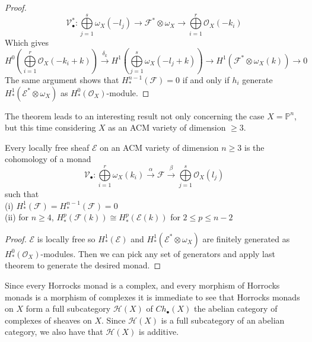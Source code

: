 \documentclass[
	oldfontcommands,
	sumario=abnt-6027-2012,
	12pt,			%
	openright,		%
	oneside,		%
	a4paper,		%
	english,		%
	brazil			%
	]{imecc-unicamp}
\begin{document}
\begin{proof}
\begin{equation}
\mathcal{V}_\bullet ^* :\bigoplus\limits_{j=1}^s \omega_X (-l_j) \to \mathcal{F}^* \otimes \omega_X \to \bigoplus\limits_{i=1}^r \mathcal{O}_X (-k_i)
\end{equation}
Which gives
\begin{equation}
H^0(\bigoplus\limits_{i=1}^r \mathcal{O}_X (-k_i+k)) \overset{\delta_k}{\to} H^1(\bigoplus\limits_{j=1}^s \omega_X (-l_j+k)) \to H^1(\mathcal{F}^* \otimes \omega_X(k)) \to 0
\end{equation}
The same argument shows that $H^{n-1}_* (\mathcal{F})=0$ if and only if $h_i$ generate $H^1 _* (\mathcal{E}^* \otimes \omega_X)$ as $H^0 _* (\mathcal{O}_X)$-module.
\end{proof}
The theorem leads to an interesting result not only concerning the case $X=\mathbb{P}^n$, but this time considering $X$ as an ACM variety of dimension $\geq 3$.
\begin{corollary}\cite[Jardim \& Martins]{jardim2}
Every locally free sheaf $\mathcal{E}$ on an ACM variety of dimension $n \geq 3$ is the cohomology of a monad
\begin{equation}
\mathcal{V}_\bullet : \bigoplus\limits_{i=1}^r \omega_X (k_i) \overset{ \alpha }{ \to} \mathcal{F} \overset{ \beta }{ \to} \bigoplus\limits_{j=1}^s \mathcal{O}_X (l_j)
\end{equation}
such that \\
(i) $H^1_*(\mathcal{F}) = H^{n-1}_*(\mathcal{F})=0$ \\
(ii) for $n \geq 4$, $H^p_* (\mathcal{F}(k)) \cong H^p_*(\mathcal{E}(k))$ for $2 \leq p \leq n-2$
\end{corollary}
\begin{proof}
$\mathcal{E}$ is locally free so $H^1_*(\mathcal{E})$ and $H^1_*(\mathcal{E}^* \otimes \omega_X)$ are finitely generated as $H^0_*(\mathcal{O}_X)$-modules. Then we can pick any set of generators and apply last theorem to generate the desired monad.
\end{proof}
Since every Horrocks monad is a complex, and every morphism of Horrocks monads is a morphism of complexes it is immediate to see that Horrocks monads on $X$ form a full subcategory $\mathcal{H}(X)$ of $Ch_\bullet(X)$ the abelian category of complexes of sheaves on $X$. Since $\mathcal{H}(X)$ is a full subcategory of an abelian category, we also have that $\mathcal{H}(X)$ is additive.
\end{document}
